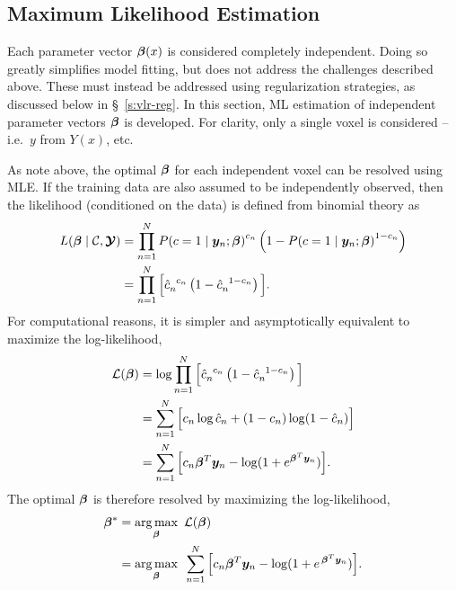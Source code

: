 \subsection{Maximum Likelihood Estimation}
Each parameter vector $\bm{\beta}(x)$ is considered completely independent.
Doing so greatly simplifies model fitting, but does not address the challenges described above.
These must instead be addressed using regularization strategies,
as discussed below in \S~\ref{s:vlr-reg}.
In this section, ML estimation of independent parameter vectors $\bm{\beta}$ is developed.
For clarity, only a single voxel is considered -- i.e.\ $y$ from $Y(x)$, etc.
\par
As note above, the optimal $\bm{\beta}$ for each independent voxel can be resolved using MLE.
If the training data are also assumed to be independently observed,
then the likelihood (conditioned on the data) is defined from binomial theory as
\begin{align}
  L(\bb\mid\C,\bY) &= \prod_{n=1}^{N} {P(c=1\mid\by_n;\bb)}^{c_n}
                              \left(1-{P(c=1\mid\by_n;\bb)}^{1-c_n}\right)\nonumber\\
                   &= \prod_{n=1}^{N} \Big[\hat{c}_n^{\en c_n}
                                   \left(1-\hat{c}_n^{\en 1-c_n}\right)\Big].%
  \label{eq:likelihood}
\end{align}
For computational reasons,
it is simpler and asymptotically equivalent to maximize the log-likelihood,
\begin{align}
  \L(\bb) &= \log{ \prod_{n=1}^{N} \Big[\hat{c}_n^{\en c_n}
                                \left(1-\hat{c}_n^{\en 1-c_n}\right)\Big] }\nonumber\\
          &= \sum_{n=1}^{N} \Big[ c_n \log \hat{c}_n + (1-c_n) \log (1-\hat{c}_n) \Big] \nonumber\\
          &= \sum_{n=1}^{N} \Big[ c_n \bb^T\by_n - \log (1+e^{\bb^T\by_n}) \Big].%
  \label{eq:loglikelihood}
\end{align}
The optimal $\bm{\beta}$ is therefore resolved by maximizing the log-likelihood,
\begin{align}
  \bb^* &= \underset{\bb}{\arg\max}\en\L(\bb)\nonumber\\
        &= \underset{\bb}{\arg\max}\en\sum_{n=1}^{N}
             \Big[ c_n \bb^T\by_n - \log (1+e^{\et\bb^T\by_n}) \Big].%
  \label{eq:argmaxmle}
\end{align}
